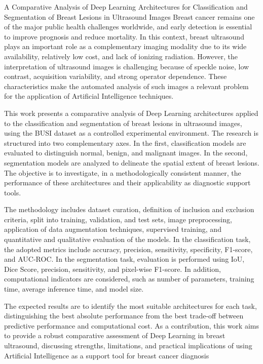 \documentclass[tcc,capa]{texufpel}
\begin{document}
\begin{englishabstract}{A Comparative Analysis of Deep Learning Architectures for Classification and Segmentation of Breast Lesions in Ultrasound Images}
Breast cancer remains one of the major public health challenges worldwide, and early detection is essential to improve prognosis and reduce mortality. In this context, breast ultrasound plays an important role as a complementary imaging modality due to its wide availability, relatively low cost, and lack of ionizing radiation. However, the interpretation of ultrasound images is challenging because of speckle noise, low contrast, acquisition variability, and strong operator dependence. These characteristics make the automated analysis of such images a relevant problem for the application of Artificial Intelligence techniques.

This work presents a comparative analysis of Deep Learning architectures applied to the classification and segmentation of breast lesions in ultrasound images, using the BUSI dataset as a controlled experimental environment. The research is structured into two complementary axes. In the first, classification models are evaluated to distinguish normal, benign, and malignant images. In the second, segmentation models are analyzed to delineate the spatial extent of breast lesions. The objective is to investigate, in a methodologically consistent manner, the performance of these architectures and their applicability as diagnostic support tools.

The methodology includes dataset curation, definition of inclusion and exclusion criteria, split into training, validation, and test sets, image preprocessing, application of data augmentation techniques, supervised training, and quantitative and qualitative evaluation of the models. In the classification task, the adopted metrics include accuracy, precision, sensitivity, specificity, F1-score, and AUC-ROC. In the segmentation task, evaluation is performed using IoU, Dice Score, precision, sensitivity, and pixel-wise F1-score. In addition, computational indicators are considered, such as number of parameters, training time, average inference time, and model size.

The expected results are to identify the most suitable architectures for each task, distinguishing the best absolute performance from the best trade-off between predictive performance and computational cost. As a contribution, this work aims to provide a robust comparative assessment of Deep Learning in breast ultrasound, discussing strengths, limitations, and practical implications of using Artificial Intelligence as a support tool for breast cancer diagnosis
\end{englishabstract}
\end{document}
